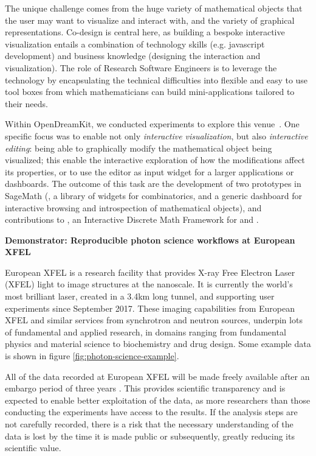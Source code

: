   The unique challenge comes from the huge variety of mathematical
  objects that the user may want to visualize and interact with, and
  the variety of graphical representations. Co-design is central here,
  as building a bespoke interactive visualization entails a
  combination of technology skills (e.g. javascript development) and
  business knowledge (designing the interaction and visualization).
  The role of Research Software Engineers is to leverage the
  technology by encapsulating the technical difficulties into flexible
  and easy to use tool boxes from which mathematicians can build
  mini-applications tailored to their needs.

  Within OpenDreamKit, we conducted experiments to explore this
  venue~\cite{ODK_D4.16}. One specific focus was to enable not only
  \emph{interactive visualization}, but also \emph{interactive
    editing}: being able to graphically modify the mathematical object
  being visualized; this enable the interactive exploration of how the
  modifications affect its properties, or to use the editor as input
  widget for a larger applications or dashboards. The outcome of this
  task are the development of two prototypes in SageMath
  (, a library of widgets for
  combinatorics, and  a generic dashboard for
  interactive browsing and introspection of mathematical objects), and
  contributions to , an Interactive Discrete Math
  Framework for  and .

\medskip
\textbf{Demonstrator: Reproducible photon science workflows at European XFEL}


  European XFEL is a research facility that provides X-ray Free
  Electron Laser (XFEL) light to image structures at the nanoscale. It
  is currently the world's most brilliant laser, created in a 3.4km
  long tunnel, and supporting user experiments since September
  2017. These imaging capabilities from European XFEL and similar
  services from synchrotron and neutron sources, underpin lots of
  fundamental and applied research, in domains ranging from fundamental
  physics and material science to biochemistry and drug design. Some
  example data is shown in figure \ref{fig:photon-science-example}.

  All of the data recorded at European XFEL will be made freely
  available after an embargo period of three years
  \cite{EuXFEL-datapolicy-2017}. This provides scientific transparency
  and is expected to enable better exploitation of the data, as more
  researchers than those conducting the experiments have access to the
  results. If the analysis steps are not carefully recorded, there is a risk
  that the necessary understanding of the data is lost by the time it
  is made public or subsequently, greatly reducing its scientific
  value.

